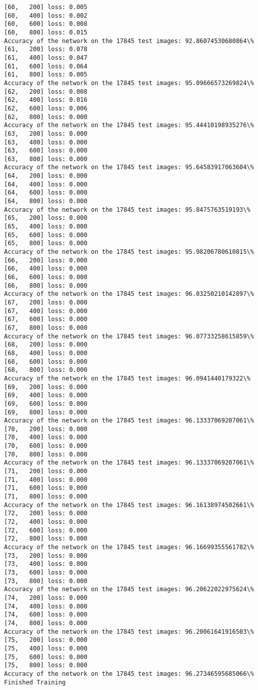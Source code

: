\documentclass[11pt]{article}
\begin{document}
\begin{Verbatim}[commandchars=\\\{\}]
[60,   200] loss: 0.005
[60,   400] loss: 0.002
[60,   600] loss: 0.008
[60,   800] loss: 0.015
Accuracy of the network on the 17845 test images: 92.86074530680864\%
[61,   200] loss: 0.078
[61,   400] loss: 0.047
[61,   600] loss: 0.064
[61,   800] loss: 0.005
Accuracy of the network on the 17845 test images: 95.09666573269824\%
[62,   200] loss: 0.008
[62,   400] loss: 0.016
[62,   600] loss: 0.006
[62,   800] loss: 0.000
Accuracy of the network on the 17845 test images: 95.44410198935276\%
[63,   200] loss: 0.000
[63,   400] loss: 0.000
[63,   600] loss: 0.000
[63,   800] loss: 0.000
Accuracy of the network on the 17845 test images: 95.64583917063604\%
[64,   200] loss: 0.000
[64,   400] loss: 0.000
[64,   600] loss: 0.000
[64,   800] loss: 0.000
Accuracy of the network on the 17845 test images: 95.8475763519193\%
[65,   200] loss: 0.000
[65,   400] loss: 0.000
[65,   600] loss: 0.000
[65,   800] loss: 0.000
Accuracy of the network on the 17845 test images: 95.98206780610815\%
[66,   200] loss: 0.000
[66,   400] loss: 0.000
[66,   600] loss: 0.000
[66,   800] loss: 0.000
Accuracy of the network on the 17845 test images: 96.03250210142897\%
[67,   200] loss: 0.000
[67,   400] loss: 0.000
[67,   600] loss: 0.000
[67,   800] loss: 0.000
Accuracy of the network on the 17845 test images: 96.07733258615859\%
[68,   200] loss: 0.000
[68,   400] loss: 0.000
[68,   600] loss: 0.000
[68,   800] loss: 0.000
Accuracy of the network on the 17845 test images: 96.0941440179322\%
[69,   200] loss: 0.000
[69,   400] loss: 0.000
[69,   600] loss: 0.000
[69,   800] loss: 0.000
Accuracy of the network on the 17845 test images: 96.13337069207061\%
[70,   200] loss: 0.000
[70,   400] loss: 0.000
[70,   600] loss: 0.000
[70,   800] loss: 0.000
Accuracy of the network on the 17845 test images: 96.13337069207061\%
[71,   200] loss: 0.000
[71,   400] loss: 0.000
[71,   600] loss: 0.000
[71,   800] loss: 0.000
Accuracy of the network on the 17845 test images: 96.16138974502661\%
[72,   200] loss: 0.000
[72,   400] loss: 0.000
[72,   600] loss: 0.000
[72,   800] loss: 0.000
Accuracy of the network on the 17845 test images: 96.16699355561782\%
[73,   200] loss: 0.000
[73,   400] loss: 0.000
[73,   600] loss: 0.000
[73,   800] loss: 0.000
Accuracy of the network on the 17845 test images: 96.20622022975624\%
[74,   200] loss: 0.000
[74,   400] loss: 0.000
[74,   600] loss: 0.000
[74,   800] loss: 0.000
Accuracy of the network on the 17845 test images: 96.20061641916503\%
[75,   200] loss: 0.000
[75,   400] loss: 0.000
[75,   600] loss: 0.000
[75,   800] loss: 0.000
Accuracy of the network on the 17845 test images: 96.27346595685066\%
Finished Training

    \end{Verbatim}
\end{document}
